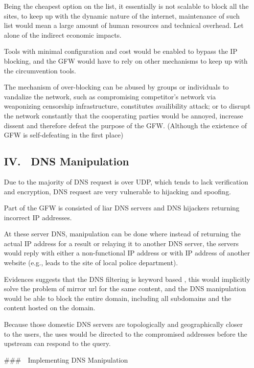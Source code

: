 Being the cheapest option on the list, it essentially is not scalable to
block all the sites, to keep up with the dynamic nature of the internet,
maintenance of such list would mean a large amount of human resources
and technical overhead. Let alone of the indirect economic impacts.

Tools with minimal configuration and cost would be enabled to bypass the
IP blocking, and the GFW would have to rely on other mechanisms to keep
up with the circumvention tools.

The mechanism of over-blocking can be abused by groups or individuals to
vandalize the network, such as compromising competitor's network via
weaponizing censorship infrastructure, constitutes availibility attack;
or to disrupt the network constantly that the cooperating parties would
be annoyed, increase dissent and therefore defeat the purpose of the
GFW. (Although the existence of GFW is self-defeating in the first
place)

\hypertarget{iv.-dns-manipulation}{%
\subsection{IV. DNS Manipulation}\label{iv.-dns-manipulation}}

Due to the majority of DNS request is over UDP, which tends to lack
verification and encryption, DNS request are very vulnerable to
hijacking and spoofing. \cite{20_dnsUDP}

Part of the GFW is consisted of liar DNS servers and DNS hijackers
returning incorrect IP addresses.

At these server DNS, manipulation can be done where instead of returning
the actual IP address for a result or relaying it to another DNS server,
the servers would reply with either a non-functional IP address or with
IP address of another website (e.g., leads to the site of local police
department).

Evidences suggests that the DNS filtering is keyword based
\cite{21_dnsCompreh} , this would implicitly solve the problem of mirror
url for the same content, and the DNS manipulation would be able to
block the entire domain, including all subdomains and the content hosted
on the domain.

Because those domestic DNS servers are topologically and geographically
closer to the users, the uses would be directed to the compromised
addresses before the upstream can respond to the query.

\#\#\# Implementing DNS Manipulation

